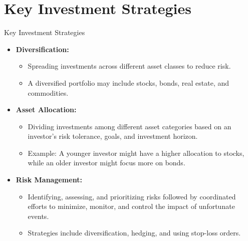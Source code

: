 \documentclass{beamer}
\begin{document}
\section{Key Investment Strategies}
\begin{frame}{Key Investment Strategies}
    \begin{itemize}
        \item \textbf{Diversification:}
        \begin{itemize}
            \item Spreading investments across different asset classes to reduce risk.
            \item A diversified portfolio may include stocks, bonds, real estate, and commodities.
        \end{itemize}
        \item \textbf{Asset Allocation:}
        \begin{itemize}
            \item Dividing investments among different asset categories based on an investor's risk tolerance, goals, and investment horizon.
            \item Example: A younger investor might have a higher allocation to stocks, while an older investor might focus more on bonds.
        \end{itemize}
        \item \textbf{Risk Management:}
        \begin{itemize}
            \item Identifying, assessing, and prioritizing risks followed by coordinated efforts to minimize, monitor, and control the impact of unfortunate events.
            \item Strategies include diversification, hedging, and using stop-loss orders.
        \end{itemize}
    \end{itemize}
\end{frame}
\end{document}
